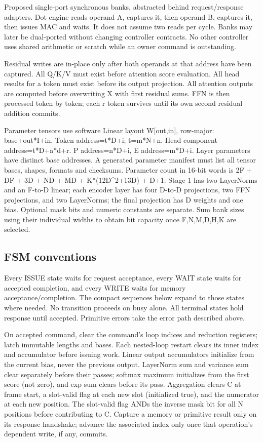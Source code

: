 \documentclass[11pt,a4paper]{article}
\begin{document}
Proposed single-port synchronous banks, abstracted behind request/response adapters. Dot engine reads operand A, captures it, then operand B, captures it, then issues MAC and waits. It does not assume two reads per cycle. Banks may later be dual-ported without changing controller contracts. No other controller uses shared arithmetic or scratch while an owner command is outstanding.

Residual writes are in-place only after both operands at that address have been captured. All Q/K/V must exist before attention score evaluation. All head results for a token must exist before its output projection. All attention outputs are computed before overwriting X with first residual sums. FFN is then processed token by token; each r token survives until its own second residual addition commits.

Parameter tensors use software Linear layout W[out,in], row-major: base+out*I+in. Token address=t*D+i; t=m*N+n. Head component address=t*D+a*d+r. P address=n*D+i, E address=m*D+i. Layer parameters have distinct base addresses. A generated parameter manifest must list all tensor bases, shapes, formats and checksums. Parameter count in 16-bit words is 2F + DF + 3D + ND + MD + K*(12D\textasciicircum{}2+13D) + D+1: Stage 1 has two LayerNorms and an F-to-D linear; each encoder layer has four D-to-D projections, two FFN projections, and two LayerNorms; the final projection has D weights and one bias. Optional mask bits and numeric constants are separate. Sum bank sizes using their individual widths to obtain bit capacity once F,N,M,D,H,K are selected.

\subsection{FSM conventions}

Every ISSUE state waits for request acceptance, every WAIT state waits for accepted completion, and every WRITE waits for memory acceptance/completion. The compact sequences below expand to those states where needed. No transition proceeds on busy alone. All terminal states hold response until accepted. Primitive errors take the error path described above.

On accepted command, clear the command's loop indices and reduction registers; latch immutable lengths and bases. Each nested-loop restart clears its inner index and accumulator before issuing work. Linear output accumulators initialize from the current bias, never the previous output. LayerNorm sum and variance sum clear separately before their passes; softmax maximum initializes from the first score (not zero), and exp sum clears before its pass. Aggregation clears C at frame start, a slot-valid flag at each new slot (initialized true), and the numerator at each new position. The slot-valid flag ANDs the inverse mask bit for all N positions before contributing to C. Capture a memory or primitive result only on its response handshake; advance the associated index only once that operation's dependent write, if any, commits.
\end{document}
